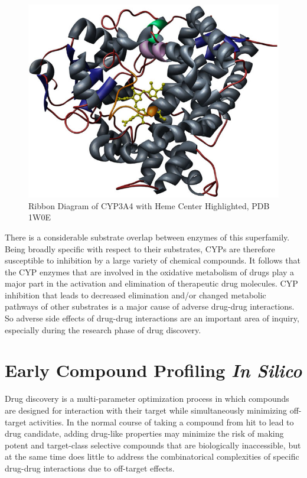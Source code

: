\begin{figure}[H]
  \centering
   \includegraphics[width=1\textwidth]{../img/CYP3A4_heme.jpg}
  \caption[Ribbon Diagram of CYP3A4 with Heme Center]{Ribbon Diagram of CYP3A4 with Heme Center Highlighted, PDB 1W0E}
  \label{fig:heme}
\end{figure}

There is a considerable substrate overlap between enzymes of this superfamily. Being broadly specific with respect to their substrates, CYPs are therefore susceptible to inhibition by a large variety of chemical compounds. It follows that the CYP enzymes that are involved in the oxidative metabolism of drugs play a major part in the activation and elimination of therapeutic drug molecules. CYP inhibition that leads to decreased elimination and/or changed metabolic pathways of other substrates is a major cause of adverse drug-drug interactions. \cite{Lapins2013} So adverse side effects of drug-drug interactions are an important area of inquiry, especially during the research phase of drug discovery.


\section{Early Compound Profiling \textit{In Silico}}

Drug discovery is a multi-parameter optimization process in which compounds are designed for interaction with their target while simultaneously minimizing off-target activities. \cite{Zlokarnik2005} In the normal course of taking a compound from hit to lead to drug candidate, adding drug-like properties may minimize the risk of making potent and target-class selective compounds that are biologically inaccessible, but at the same time does little to address the combinatorical complexities of specific drug-drug interactions due to off-target effects.

